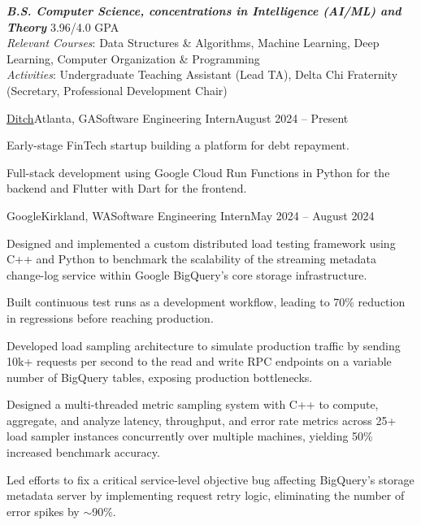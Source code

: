 \documentclass{article}
\begin{document}
\thispagestyle{empty}


\begin{flushleft}


{\textbf{\textit{B.S. Computer Science, concentrations in Intelligence (AI/ML) and Theory}} \hfill 3.96/4.0 GPA \\ \textit{Relevant Courses}:
    Data Structures \& Algorithms,
    Machine Learning,
    Deep Learning,
    Computer Organization \& Programming
    \\
    \textit{Activities}: Undergraduate Teaching Assistant (Lead TA), Delta Chi Fraternity (Secretary, Professional Development Chair)
}


    \begin{experience}{\href{https://ditch.io/}{Ditch}}{Atlanta, GA}{Software Engineering Intern}{August 2024 -- Present}
        \item Early-stage FinTech startup building a platform for debt repayment.
        \item Full-stack development using Google Cloud Run Functions in Python for the backend and Flutter with Dart for the frontend.
    \end{experience}

    \begin{experience}{Google}{Kirkland, WA}{Software Engineering Intern}{May 2024 -- August 2024}
        \item Designed and implemented a custom distributed load testing framework using C++ and Python to benchmark the scalability of the streaming metadata change-log service within Google BigQuery's core storage infrastructure.
        \item Built continuous test runs as a development workflow, leading to 70\% reduction in regressions before reaching production.
        \item Developed load sampling architecture to simulate production traffic by sending 10k+ requests per second to the read and write RPC endpoints on a variable number of BigQuery tables, exposing production bottlenecks.
        \item Designed a multi-threaded metric sampling system with C++ to compute, aggregate, and analyze latency, throughput, and error rate metrics across 25+ load sampler instances concurrently over multiple machines, yielding 50\% increased benchmark accuracy.
        \item Led efforts to fix a critical service-level objective bug affecting BigQuery's storage metadata server by implementing request retry logic, eliminating the number of error spikes by $\sim$90\%.
    \end{experience}


\end{flushleft}
\end{document}
